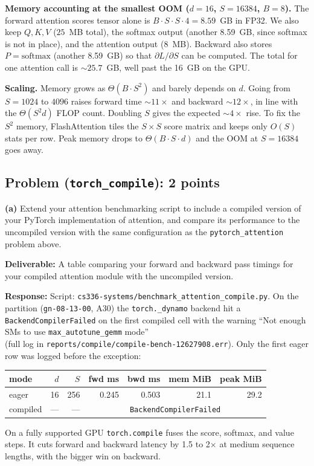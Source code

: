 \documentclass[11pt]{article}
\begin{document}
\noindent\textbf{Memory accounting at the smallest OOM ($d=16$, $S=16384$, $B=8$).} The forward attention scores tensor alone is $B \cdot S \cdot S \cdot 4 = 8.59$~GB in FP32. We also keep $Q, K, V$ ($25$~MB total), the softmax output (another 8.59~GB, since softmax is not in place), and the attention output ($8$~MB). Backward also stores $P = \text{softmax}$ (another 8.59~GB) so that $\partial L/\partial S$ can be computed. The total for one attention call is $\sim 25.7$~GB, well past the 16~GB on the GPU.

\noindent\textbf{Scaling.} Memory grows as $\Theta(B \cdot S^2)$ and barely depends on $d$. Going from $S=1024$ to $4096$ raises forward time $\sim 11\times$ and backward $\sim 12\times$, in line with the $\Theta(S^2 d)$ FLOP count. Doubling $S$ gives the expected $\sim 4\times$ rise. To fix the $S^2$ memory, FlashAttention tiles the $S \times S$ score matrix and keeps only $O(S)$ stats per row. Peak memory drops to $\Theta(B \cdot S \cdot d)$ and the OOM at $S=16384$ goes away.

\subsection*{Problem (\texttt{torch\_compile}): 2 points}

\textbf{(a)} Extend your attention benchmarking script to include a compiled version of your PyTorch implementation of attention, and compare its performance to the uncompiled version with the same configuration as the \texttt{pytorch\_attention} problem above.

\textbf{Deliverable:} A table comparing your forward and backward pass timings for your compiled attention module with the uncompiled version.

\vspace{0.25cm}
\textbf{Response:}
Script: \texttt{cs336-systems/benchmark\_attention\_compile.py}. On the partition (\verb|gn-08-13-00|, A30) the \verb|torch._dynamo| backend hit a \texttt{BackendCompilerFailed} on the first compiled cell with the warning ``Not enough SMs to use \texttt{max\_autotune\_gemm} mode'' \\(full log in \verb|reports/compile/compile-bench-12627908.err|). Only the first eager row was logged before the exception:

\begin{table}[H]
\centering\small
\begin{tabular}{lrrrrrr}
\toprule
mode & $d$ & $S$ & fwd ms & bwd ms & mem MiB & peak MiB \\
\midrule
eager & 16 & 256 & 0.245 & 0.503 & 21.1 & 29.2 \\
compiled & --- & --- & \multicolumn{4}{c}{\texttt{BackendCompilerFailed}} \\
\bottomrule
\end{tabular}
\end{table}
On a fully supported GPU \verb|torch.compile| fuses the score, softmax, and value steps. It cuts forward and backward latency by 1.5 to 2$\times$ at medium sequence lengths, with the bigger win on backward.
\end{document}
